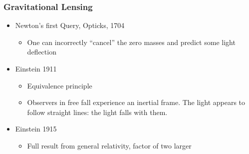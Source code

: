 \documentclass{beamer}
\begin{document}
\frame
{
    \frametitle{Gravitational Lensing}

    \begin{itemize}

        \item Newton's first Query, Opticks, 1704
            \begin{itemize}
                \item One can incorrectly ``cancel'' the zero masses and predict
                    some light deflection
            \end{itemize}

        \item Einstein 1911
            \begin{itemize}

                \item Equivalence principle

                \item Observers in free fall experience an inertial frame.  The
                    light appears to follow straight lines: the light falls
                    with them.

            \end{itemize}

        \item Einstein 1915
            \begin{itemize}
                \item Full result from general relativity, factor of two larger
            \end{itemize}


    \end{itemize}

}


	
\end{document}
